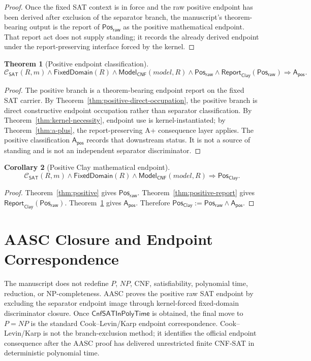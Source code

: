 \documentclass[11pt]{article}
\newtheorem{theorem}{Theorem}[section]
\newtheorem{corollary}[theorem]{Corollary}
\theoremstyle{definition}
\theoremstyle{remark}
\newcommand{\PosRaw}{\mathsf{Pos}_{\mathsf{raw}}}
\newcommand{\Apos}{\mathsf{A}_{\mathsf{pos}}}
\newcommand{\PosClay}{\mathsf{Pos}_{\mathsf{Clay}}}
\newcommand{\CnfSATP}{\mathsf{CnfSATInPolyTime}}
\newcommand{\ClayCtx}{\mathcal{C}_{\mathsf{SAT}}(R,m)}
\newcommand{\ReportClay}[1]{\mathsf{Report}_{\mathsf{Clay}}(#1)}
\newcommand{\FixedDom}{\mathsf{FixedDomain}}
\newcommand{\ModelOfCnf}{\mathsf{Model}_{\mathsf{CNF}}}
\begin{document}
\begin{proof}
Once the fixed SAT context is in force and the raw positive endpoint has been derived after exclusion of the separator branch, the manuscript's theorem-bearing output is the report of \(\PosRaw\) as the positive mathematical endpoint. That report act does not supply standing; it records the already derived endpoint under the report-preserving interface forced by the kernel.
\end{proof}

\begin{theorem}[Positive endpoint classification]\label{thm:pos-class}
\[
  \ClayCtx\wedge\FixedDom(R)\wedge\ModelOfCnf(model,R)\wedge\PosRaw\wedge\ReportClay{\PosRaw}
  \Rightarrow \Apos.
\]
\end{theorem}

\begin{proof}
The positive branch is a theorem-bearing endpoint report on the fixed SAT carrier. By Theorem~\ref{thm:positive-direct-occupation}, the positive branch is direct constructive endpoint occupation rather than separator classification. By Theorem~\ref{thm:kernel-necessity}, endpoint use is kernel-instantiated; by Theorem~\ref{thm:a-plus}, the report-preserving A+ consequence layer applies. The positive classification \(\Apos\) records that downstream status. It is not a source of standing and is not an independent separator discriminator.
\end{proof}

\begin{corollary}[Positive Clay mathematical endpoint]\label{cor:pos-clay}
\[
  \ClayCtx\wedge\FixedDom(R)\wedge\ModelOfCnf(model,R)\Rightarrow\PosClay.
\]
\end{corollary}

\begin{proof}
Theorem~\ref{thm:positive} gives \(\PosRaw\). Theorem~\ref{thm:positive-report} gives \(\ReportClay{\PosRaw}\). Theorem~\ref{thm:pos-class} gives \(\Apos\). Therefore \(\PosClay:=\PosRaw\wedge\Apos\).
\end{proof}

\section{AASC Closure and Endpoint Correspondence}

The manuscript does not redefine \(P\), \(NP\), CNF, satisfiability, polynomial time, reduction, or NP-completeness. AASC proves the positive raw SAT endpoint by excluding the separator endpoint image through kernel-forced fixed-domain discriminator closure. Once \(\CnfSATP\) is obtained, the final move to \(P=NP\) is the standard Cook--Levin/Karp endpoint correspondence. Cook--Levin/Karp is not the branch-exclusion method; it identifies the official endpoint consequence after the AASC proof has delivered unrestricted finite CNF-SAT in deterministic polynomial time.
\end{document}
